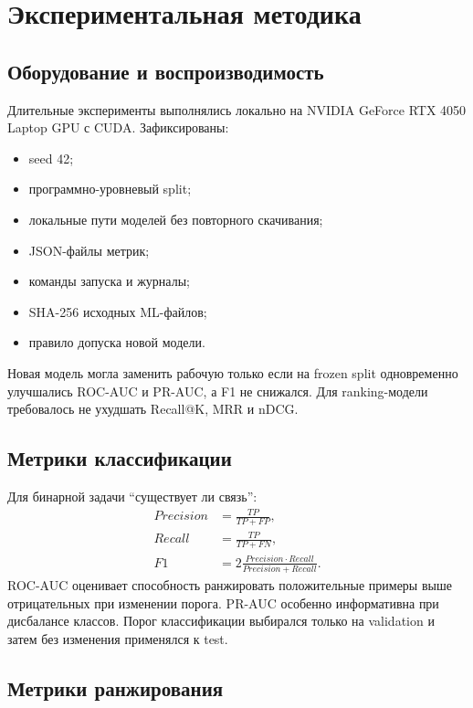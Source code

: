 \documentclass[twoside,11pt]{article}
\begin{document}
\section{Экспериментальная методика}

\subsection{Оборудование и воспроизводимость}

Длительные эксперименты выполнялись локально на NVIDIA GeForce RTX 4050 Laptop GPU с CUDA. Зафиксированы:
\begin{itemize}
  \item seed 42;
  \item программно-уровневый split;
  \item локальные пути моделей без повторного скачивания;
  \item JSON-файлы метрик;
  \item команды запуска и журналы;
  \item SHA-256 исходных ML-файлов;
  \item правило допуска новой модели.
\end{itemize}

Новая модель могла заменить рабочую только если на frozen split одновременно улучшались ROC-AUC и PR-AUC, а F1 не снижался. Для ranking-модели требовалось не ухудшать Recall@K, MRR и nDCG.

\subsection{Метрики классификации}

Для бинарной задачи ``существует ли связь'':
\begin{align}
  Precision &= \frac{TP}{TP+FP},\\
  Recall &= \frac{TP}{TP+FN},\\
  F1 &= 2\frac{Precision\cdot Recall}{Precision+Recall}.
  \label{eq:classification-metrics}
\end{align}
ROC-AUC оценивает способность ранжировать положительные примеры выше отрицательных при изменении порога. PR-AUC особенно информативна при дисбалансе классов. Порог классификации выбирался только на validation и затем без изменения применялся к test.

\subsection{Метрики ранжирования}
\end{document}
